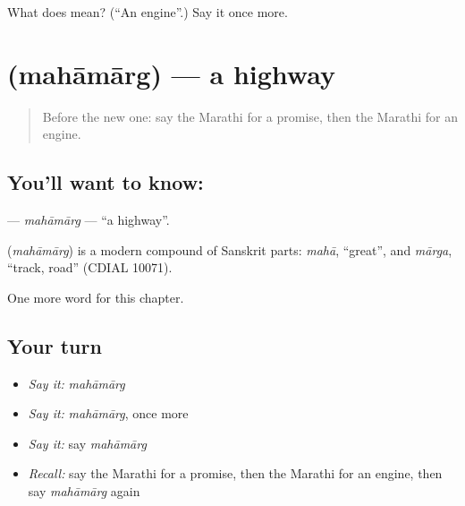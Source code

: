 \begin{tcolorbox}[breakable,colback=teal!4,colframe=teal!35!black,title={Before you move on}]
What does  mean? (\textquotedblleft{}An engine\textquotedblright{}.) Say it once more.
\end{tcolorbox}
\section[\texorpdfstring{\mr{महामार्ग} (mahāmārg)}{महामार्ग (mahāmārg)}]{ (mahāmārg) — a highway}

\label{lesson:MR-C266-mahamarg}



\begin{quote}
Before the new one: say the Marathi for a promise, then the Marathi for an engine.
\end{quote}

\subsection*{You'll want to know: }
\textbf{} — \emph{mahāmārg} — \textquotedblleft{}a highway\textquotedblright{}.

\begin{cousinweb}
\textbf{} (\emph{mahāmārg}) is a modern compound of Sanskrit parts: \emph{mahā}, \textquotedblleft{}great\textquotedblright{}, and \emph{mārga}, \textquotedblleft{}track, road\textquotedblright{} (CDIAL 10071).
\end{cousinweb}

\begin{grammarlens}[title={What you've built}]
One more word for this chapter.
\end{grammarlens}

\subsection*{Your turn}
\begin{itemize}
\raggedright
  \item \emph{Say it:} \emph{mahāmārg}
  \item \emph{Say it:} \emph{mahāmārg}, once more
  \item \emph{Say it:} say \emph{mahāmārg}
  \item \emph{Recall:} say the Marathi for a promise, then the Marathi for an engine, then say \emph{mahāmārg} again
\end{itemize}

